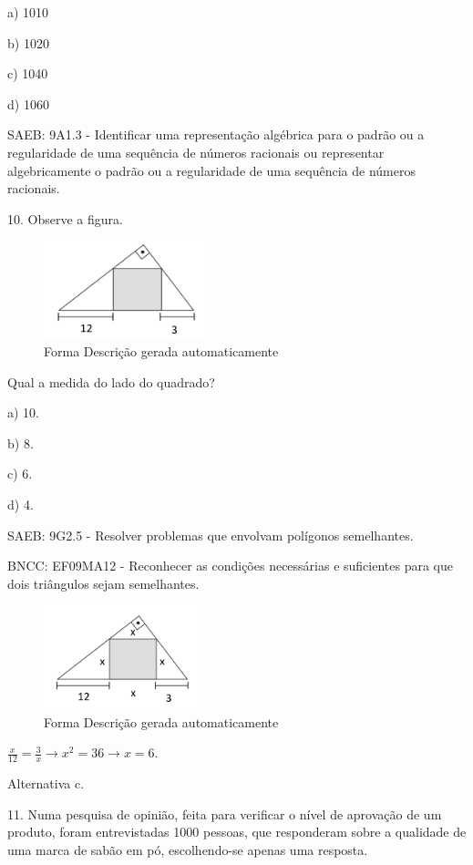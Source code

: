 \begin{escolha}
{{{\begin{escolha}
{{{{{\begin{escolha}
\begin{escolha}
{\begin{q°}
a) 1010

b) 1020

c) 1040

d) 1060

SAEB: 9A1.3 - Identificar uma representação algébrica para o padrão ou a
regularidade de uma sequência de números racionais ou representar
algebricamente o padrão ou a regularidade de uma sequência de números
racionais.

10. Observe a figura.

\begin{figure}
\centering
\includegraphics[width=1.85417in,height=1.11601in]{./_SAEB_9_MAT/media/image272.png}
\caption{Forma Descrição gerada automaticamente}
\end{figure}

Qual a medida do lado do quadrado?

a) 10.

b) 8.

c) 6.

d) 4.

SAEB: 9G2.5 - Resolver problemas que envolvam polígonos semelhantes.

BNCC: EF09MA12 - Reconhecer as condições necessárias e suficientes para
que dois triângulos sejam semelhantes.

\begin{figure}
\centering
\includegraphics[width=1.75521in,height=1.18424in]{./_SAEB_9_MAT/media/image273.png}
\caption{Forma Descrição gerada automaticamente}
\end{figure}

\(\frac{x}{12} = \frac{3}{x} \rightarrow x^{2} = 36 \rightarrow x = 6\).

Alternativa c.

11. Numa pesquisa de opinião, feita para verificar o nível de aprovação
de um produto, foram entrevistadas 1000 pessoas, que responderam sobre a
qualidade de uma marca de sabão em pó, escolhendo-se apenas uma
resposta.


\end{q°}}
\end{escolha}
\end{escolha}}}}}}
\end{escolha}}}}
\end{escolha}
